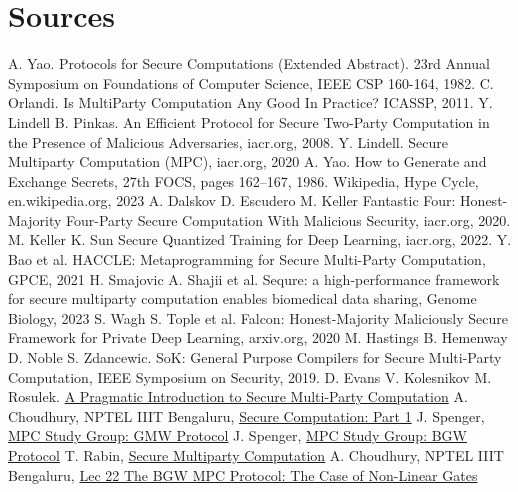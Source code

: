 \documentclass[11pt]{article}
\begin{document}
\section*{Sources}

\begin{thebibliography}{50}
     A. Yao. Protocols for Secure Computations (Extended Abstract). 23rd Annual Symposium on Foundations of Computer Science, IEEE CSP 160-164, 1982.
     C. Orlandi. Is MultiParty Computation Any Good In Practice? ICASSP, 2011.
     Y. Lindell B. Pinkas. An Efficient Protocol for Secure Two-Party Computation in the Presence of Malicious Adversaries, iacr.org, 2008.
     Y. Lindell. Secure Multiparty Computation (MPC), iacr.org, 2020
     A. Yao. How to Generate and Exchange Secrets, 27th FOCS, pages 162–167, 1986.
     Wikipedia, Hype Cycle, en.wikipedia.org, 2023
     A. Dalskov D. Escudero M. Keller Fantastic Four: Honest-Majority Four-Party Secure Computation With Malicious Security, iacr.org, 2020.
     M. Keller K. Sun Secure Quantized Training for Deep Learning, iacr.org, 2022.
     Y. Bao et al. HACCLE: Metaprogramming for Secure Multi-Party Computation, GPCE, 2021
     H. Smajovic A. Shajii et al. Sequre: a high-performance framework for secure multiparty computation enables biomedical data sharing, Genome Biology, 2023
     S. Wagh S. Tople et al. Falcon: Honest-Majority Maliciously Secure Framework for Private Deep Learning, arxiv.org, 2020
     M. Hastings B. Hemenway D. Noble S. Zdancewic. SoK: General Purpose Compilers for Secure Multi-Party Computation, IEEE Symposium on Security, 2019.
     D. Evans V. Kolesnikov M. Rosulek. \href{https://securecomputation.org/docs/pragmaticmpc.pdf}{A Pragmatic Introduction to Secure Multi-Party Computation}
     A. Choudhury, NPTEL IIIT Bengaluru, \href{https://youtube.com/playlist?list=PLgMDNELGJ1Ca3l-xioOzN86BIZ2a0N8Ds}{Secure Computation: Part 1}
     J. Spenger, \href{https://jonasspenger.github.io/blog/gmw-protocol}{MPC Study Group: GMW Protocol}
     J. Spenger, \href{https://jonasspenger.github.io/blog/bgw-protocol-and-beaver-triples}{MPC Study Group: BGW Protocol}
     T. Rabin, \href{https://www.youtube.com/watch?v=NOtsxHoIcWQ&t=2680s}{Secure Multiparty Computation}
     A. Choudhury, NPTEL IIIT Bengaluru, \href{https://www.youtube.com/watch?v=rc9p4YjaCz0&list=PLgMDNELGJ1Ca3l-xioOzN86BIZ2a0N8Ds&index=23&pp=iAQB}{Lec 22 The BGW MPC Protocol: The Case of Non-Linear Gates}

\end{thebibliography}
\end{document}
